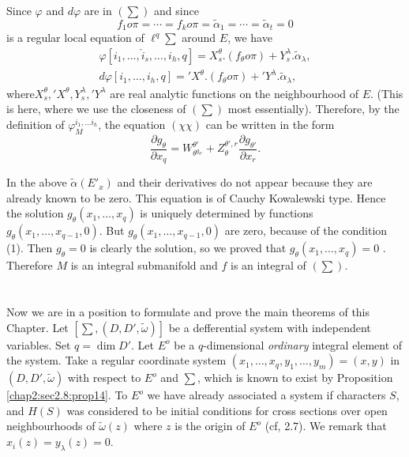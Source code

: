 Since $\varphi$ and $d \varphi$ are in $( \sum)$ and since
$$
f_1 o \pi = \cdots = f_k o \pi = \tilde{\alpha}_1 = \cdots =
\tilde{\alpha}_t =0 
$$ 
is a regular local  equation of $\ell^q \sum$ around $E$, we  have 
\begin{multline*}
  \varphi [i_1 , \ldots , \hat{i}_s , \ldots , i_h ,q] =
  X^\theta_s. (f_\theta o \pi ) +  Y_s^\lambda
  . \tilde{\alpha}_\lambda, \\ 
  d \varphi[ i_1 , \ldots , i_h,q]= 'X^\theta . (f_\theta o \pi )
  + 'Y^\lambda . \tilde{\alpha}_\lambda ,  
\end{multline*}
where\pageoriginale $X^\theta_s, 'X^\theta, Y^\lambda_s, 'Y^\lambda$ are real
analytic functions on the neighbourhood of  $E$. (This is here,
where we use the closeness of $( \sum )$ most
essentially). Therefore, by the definition of $\varphi^{i_1 , \ldots
  i_h}_{M}$, the equation $(\chi \chi)$ can be written in the form 
$$
\frac{\partial g_\theta}{\partial x_q} = W^{\theta
  '}_{\theta^{g_{\theta'}}}+ Z_\theta^{\theta ',r}  \frac{\partial
  g_{\theta'}}{\partial x_r}.   
$$ 
 
In the above $\tilde{\alpha} (E'_x)$ and their derivatives do not
appear because they are already known to be zero. This equation is of
Cauchy Kowalewski type. Hence the solution $g _{\theta}(x_1 , \ldots ,
x_q)$ is uniquely determined by functions $g_\theta (x_1 , \ldots ,
x_{q-1}, 0)$. But $g_\theta (x_1 , \ldots , x_{q-1}, 0)$ are zero,
because of the condition (1). Then $g_\theta = 0$ is clearly the
solution, so we proved that $g_\theta (x_1 , \ldots , x_q)=0$
. Therefore $M$ is an integral submanifold and $f$ is an integral of
$( \sum)$. 
 
\section{}\label{chap2:sec2.10} %

Now we are in a position to formulate and prove the main theorems of
this Chapter. Let $[ \sum , (D, D', \tilde{\omega})]$ be a
defferential system with independent variables. Set $q =  \dim
D'$. Let $ E^o$ be a $q$-dimensional \textit{ ordinary } integral
element of the system. Take a regular coordinate system $(x_1, \ldots
, x_q, y_1, \ldots , y_m)= (x, y)$ in $(D,D' , \tilde{\omega})$ with
respect to $E^o$ and $\sum$, which is known to exist by Proposition  
\ref{chap2:sec2.8:prop14}. To $E^o$ we have already associated a system if characters $S$,
and $H(S)$ was considered to be initial conditions for cross sections
over open neighbourhoods of $\tilde{\omega} (z)$ where $z$ is the
origin of $E^o$ (cf, 2.7). We remark that $x_i (z) = y_\lambda (z)
=0$. 

